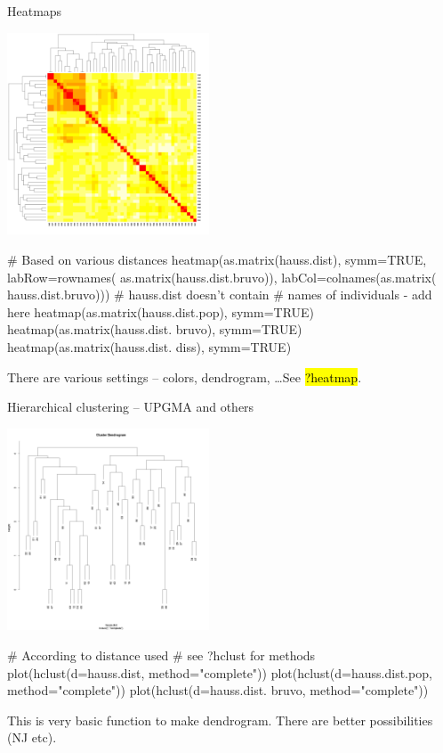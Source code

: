 \documentclass[compress, ucs, xelatex, 11pt, xcolor=svgnames,
  hyperref={
    bookmarks=true,
    unicode=true,
    colorlinks=true,
    pdftitle={Molecular data in R},
    plainpages=false,
    pdfauthor={Vojtech Zeisek},
    pdfsubject={Course about phylogeny and evolution in R},
    pdfcreator={XeLaTeX},
    pdfkeywords={R, evolution, phylogeny, molecular data},
    linkcolor=Tomato,
    anchorcolor=SaddleBrown,
    citecolor=Goldenrod,
    filecolor=DarkMagenta,
    menucolor=Sienna,
    urlcolor=DarkTurquoise,
    pdftex},
  url={hyphens, lowtilde} %
  ]{beamer}
\renewcommand{\texttt}[1]{\hl{\ttfamily #1}}
\begin{document}
\begin{frame}[fragile]{Heatmaps}
\begin{multicols}{2}
  \includegraphics[height=6cm]{heatmap.png}
  \columnbreak
  \begin{spluscode}
    # Based on various distances
    heatmap(as.matrix(hauss.dist),
      symm=TRUE, labRow=rownames(
      as.matrix(hauss.dist.bruvo)),
      labCol=colnames(as.matrix(
      hauss.dist.bruvo)))
      # hauss.dist doesn't contain
      # names of individuals - add here
    heatmap(as.matrix(hauss.dist.pop),
      symm=TRUE)
    heatmap(as.matrix(hauss.dist.
      bruvo), symm=TRUE)
    heatmap(as.matrix(hauss.dist.
      diss), symm=TRUE)
  \end{spluscode}
\end{multicols}
\begin{footnotesize}
  There are various settings -- colors, dendrogram, \ldots See \texttt{?heatmap}.
\end{footnotesize}
\vfill
\end{frame}

\begin{frame}[fragile]{Hierarchical clustering -- UPGMA and others}
\begin{multicols}{2}
  \includegraphics[height=6cm]{hierclust.png}
  \begin{spluscode}
    # According to distance used
    # see ?hclust for methods
    plot(hclust(d=hauss.dist,
      method="complete"))
    plot(hclust(d=hauss.dist.pop,
      method="complete"))
    plot(hclust(d=hauss.dist.
      bruvo, method="complete"))
  \end{spluscode}
  \vfill
  This is very basic function to make dendrogram. There are better possibilities (NJ etc).
\end{multicols}
\end{frame}
\end{document}
